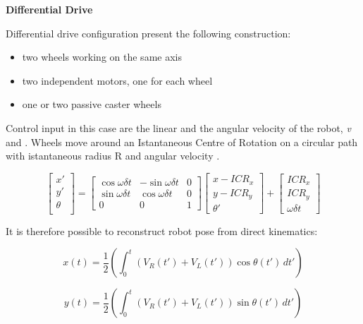 \textbf{Differential Drive}

Differential drive configuration present the following construction:
\begin{itemize}
    \item two wheels working on the same axis
    \item two independent motors, one for each wheel
    \item one or two passive caster wheels
\end{itemize}

Control input in this case are the linear and the angular velocity of the robot, \textit{v} and {\textomega}.
Wheels move around an Istantaneous Centre of Rotation on a circular path with istantaneous radius R and angular velocity \textomega.

\begin{equation}
    \begin{bmatrix}
    x' \\
    y' \\
    \theta \\
    \end{bmatrix} = \begin{bmatrix}
    \cos{\omega \delta t} & -\sin{\omega \delta t} & 0 \\
    \sin{\omega \delta t} & \cos{\omega \delta t} & 0 \\
    0 & 0 & 1
    \end{bmatrix}\begin{bmatrix}
    x - ICR_{x} \\
    y - ICR_{y} \\ 
    \theta'    \end{bmatrix} + \begin{bmatrix}
    ICR_{x} \\
    ICR_{y} \\
    \omega \delta t
    \end{bmatrix}
\end{equation}

It is therefore possible to reconstruct robot pose from direct kinematics:

\begin{equation}
    x(t) = \frac{1}{2}(\int_{0}^{t} (V_{R}(t') + V_{L}(t')) \cos{\theta(t')} \,dt')
\end{equation}

\begin{equation}
    y(t) = \frac{1}{2}(\int_{0}^{t} (V_{R}(t') + V_{L}(t')) \sin{\theta(t')} \,dt')
\end{equation}

